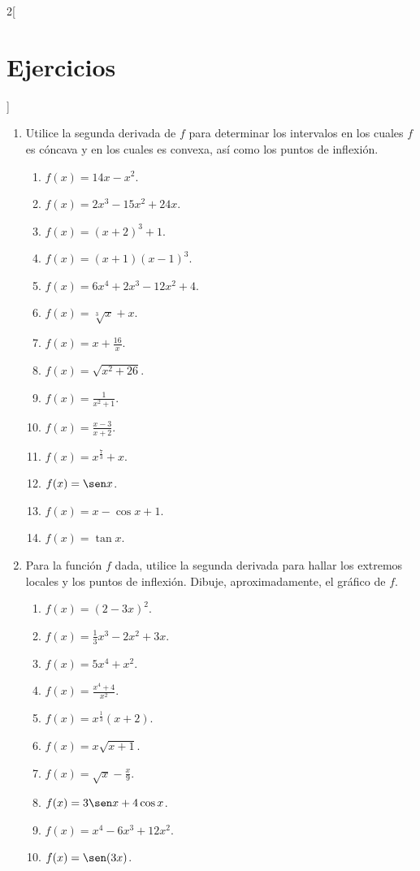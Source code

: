 \begin{multicols}{2}[\section{Ejercicios}]
\begingroup
\small
\begin{enumerate}[leftmargin=*]
\item Utilice la segunda derivada de $f$ para determinar los intervalos en los cuales $f$ es
    cóncava y en los cuales es convexa, así como los puntos de inflexión.
    \begin{enumerate}[leftmargin=*]
    \item $\displaystyle f(x) = 14x - x^2$.
    \item $\displaystyle f(x) = 2x^3 - 15x^2 + 24x$.
    \item $\displaystyle f(x) = (x + 2)^3 + 1$.
    \item $\displaystyle f(x) = (x + 1)(x - 1)^3$.
    \item $\displaystyle f(x) = 6x^4 + 2x^3 - 12x^2 + 4$.
    \item $\displaystyle f(x) = \sqrt[3]{x} + x$.
    \item $\displaystyle f(x) = x + \frac{16}{x}$.
    \item $\displaystyle f(x) = \sqrt{x^2 + 26}$.
    \item $\displaystyle f(x) = \frac{1}{x^2 + 1}$.
    \item $\displaystyle f(x) = \frac{x - 3}{x + 2}$.
    \item $\displaystyle f(x) = x^{\frac{7}{3}} + x$.
    \item $\displaystyle f(x) = \sen x$.
    \item $\displaystyle f(x) = x - \cos x + 1$.
    \item $\displaystyle f(x) = \tan x$.
    \end{enumerate}

\item Para la función $f$ dada, utilice la segunda derivada para hallar los extremos locales y
    los puntos de inflexión. Dibuje, aproximadamente, el gráfico de $f$.
    \begin{enumerate}[leftmargin=*]
    \item $\displaystyle f(x) = (2 - 3x)^2$.
    \item $\displaystyle f(x) = \frac{1}{3}x^3 - 2x^2 + 3x$.
    \item $\displaystyle f(x) = 5x^4 + x^2$.
    \item $\displaystyle f(x) = \frac{x^4 + 4}{x^2}$.
    \item $\displaystyle f(x) = x^{\frac{1}{3}}(x + 2)$.
    \item $\displaystyle f(x) = x\sqrt{x + 1}$.
    \item $\displaystyle f(x) = \sqrt{x} - \frac{x}{9}$.
    \item $\displaystyle f(x) = 3\sen x + 4\cos x$.
    \item $\displaystyle f(x) = x^4 - 6x^3 + 12x^2$.
    \item $\displaystyle f(x) = \sen(3x)$.
    \end{enumerate}


\end{enumerate}
\end{multicols}
